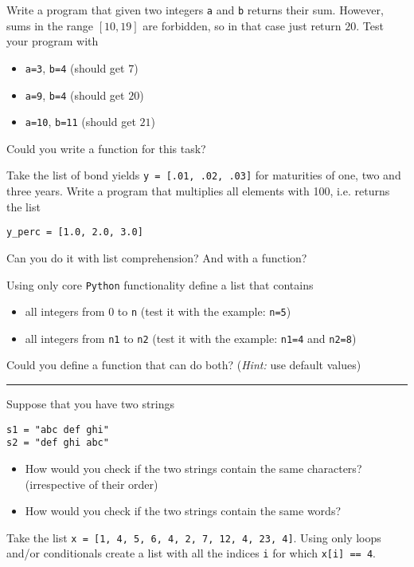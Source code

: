 \documentclass[11pt]{exam}
\begin{document}
\begin{questions}
\item Write a program that given two integers \texttt{a} and \texttt{b} returns their sum. However, sums in the range $[10, 19]$ are forbidden, so in that case just return $20$. Test your program with
\begin{itemize}
\item \texttt{a=3}, \texttt{b=4} (should get $7$)
\item \texttt{a=9}, \texttt{b=4} (should get $20$)
\item \texttt{a=10}, \texttt{b=11} (should get $21$)
\end{itemize}
Could you write a function for this task?

\item Take the list of bond yields \texttt{y = [.01, .02, .03]} for maturities of one, two and three years. Write a program that multiplies all elements with 100, i.e. returns the list 
\begin{verbatim}
y_perc = [1.0, 2.0, 3.0]
\end{verbatim}
Can you do it with list comprehension? And with a function?


\item Using only core \texttt{Python} functionality define a list that contains 
\begin{itemize}
\item all integers from 0 to \texttt{n} (test it with the example: \texttt{n=5})
\item all integers from \texttt{n1} to \texttt{n2} (test it with the example: \texttt{n1=4} and \texttt{n2=8}) 
\end{itemize}
Could you define a function that can do both? (\emph{Hint:} use default values)


\begin{center}
\noindent\rule{10cm}{0.4pt}
\end{center}

\item Suppose that you have two strings
\begin{verbatim}
s1 = "abc def ghi"
s2 = "def ghi abc"
\end{verbatim}
\begin{itemize}
\item How would you check if the two strings contain the same characters? (irrespective of their order)
\item How would you check if the two strings contain the same words?
\end{itemize}

\item Take the list \texttt{x = [1, 4, 5, 6, 4, 2, 7, 12, 4, 23, 4]}. Using only loops and/or conditionals create a list with all the indices \texttt{i} for which 
\texttt{x[i] == 4}.



\end{questions}
%
\end{document}
